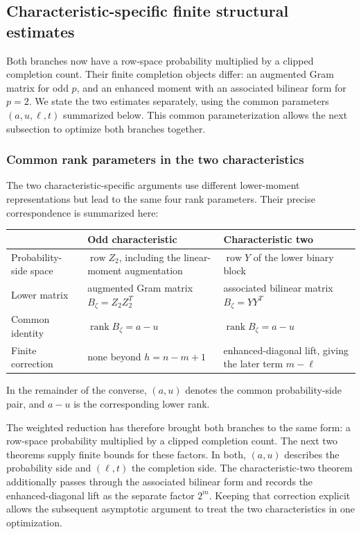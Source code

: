 \documentclass[11pt]{article}
\newcommand{\rank}{\operatorname{rank}}
\newcommand{\1}{\mathbf 1}
\theoremstyle{plain}
\theoremstyle{definition}
\theoremstyle{remark}
\begin{document}
\subsection{Characteristic-specific finite structural estimates}
\label{subsec:converse-characteristic-specific-structural-estimates}
Both branches now have a row-space probability multiplied by a clipped
completion count.  Their finite completion objects differ: an augmented Gram
matrix for odd $p$, and an enhanced moment with an associated bilinear form
for $p=2$.  We state the two estimates separately, using the common
parameters $(a,u,\ell,t)$ summarized below.  This common parameterization
allows the next subsection to optimize both branches together.

\subsubsection{Common rank parameters in the two characteristics}
\label{subsubsec:common-characteristic-rank-parameters}

The two characteristic-specific arguments use different lower-moment
representations but lead to the same four rank parameters.  Their precise
correspondence is summarized here:
\begin{center}
\small
\begin{tabularx}{0.96\textwidth}{@{}lYY@{}}
\toprule
& Odd characteristic & Characteristic two\\
\midrule
Probability-side space
& $\operatorname{row}Z_2$, including the linear-moment augmentation
& $\operatorname{row}Y$ of the lower binary block\\
Lower matrix
& augmented Gram matrix $B_\zeta=Z_2Z_2^T$
& associated bilinear matrix $B_\zeta=YY^T$\\
Common identity
& $\rank B_\zeta=a-u$
& $\rank B_\zeta=a-u$\\
Finite correction
& none beyond $h=n-m+1$
& enhanced-diagonal lift, giving the later term $m-\ell$\\
\bottomrule
\end{tabularx}
\end{center}
In the remainder of the converse, $(a,u)$ denotes the common probability-side pair, and $a-u$ is the corresponding lower rank.

The weighted reduction has therefore brought both branches to the same
form: a row-space probability multiplied by a clipped completion count.  The
next two theorems supply finite bounds for these factors.  In both, $(a,u)$
describes the probability side and $(\ell,t)$ the completion side.  The
characteristic-two theorem additionally passes through the associated
bilinear form and records the enhanced-diagonal lift as the separate factor
$2^m$.  Keeping that correction explicit allows the subsequent asymptotic
argument to treat the two characteristics in one optimization.
\end{document}
